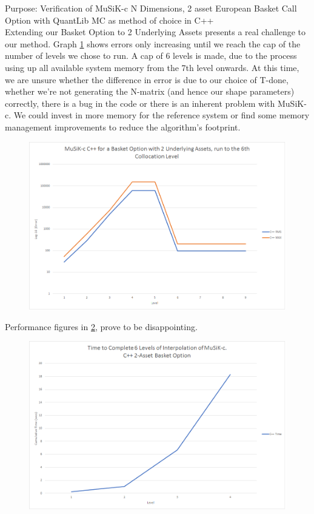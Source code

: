\documentclass[a4paper]{amsart}
\begin{document}
Purpose: Verification of MuSiK-c N Dimensions, 2 asset European Basket Call Option with QuantLib MC as method of choice in C++\\

Extending our Basket Option to 2 Underlying Assets presents a real challenge to our method. Graph \ref{fig:cppExp7e} shows errors only increasing until we reach the cap of the number of levels we chose to run. A cap of 6 levels is made, due to the process using up all available system memory from the 7th level onwards. At this time, we are unsure whether the difference in error is due to our choice of T-done, whether we're not generating the N-matrix (and hence our shape parameters) correctly, there is a bug in the code or there is an inherent problem with MuSiK-c. We could invest in more memory for the reference system or find some memory management improvements to reduce the algorithm's footprint.

\begin{figure}[h]
\centering
\includegraphics[scale=0.3]{cppExp7-errors.png}
\caption {}
\label {fig:cppExp7e}
\end{figure}

Performance figures in \ref{fig:cppExp7t}, prove to be disappointing.

\begin{figure}[h]
\centering
\includegraphics[scale=0.3]{cppExp7-time.png}
\caption {}
\label {fig:cppExp7t}
\end{figure}
\end{document}
